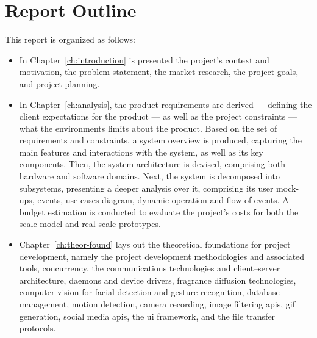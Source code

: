 \section{Report Outline}%
\label{sec:report-outline}
This report is organized as follows:
\begin{itemize}
\item In Chapter~\ref{ch:introduction} is presented the project's context and
  motivation, the problem statement, the market research, the project goals, and
  project planning.
\item In Chapter~\ref{ch:analysis}, the product requirements are derived --- defining the client expectations
for the product --- as well as the project constraints --- what the environments
limits about the product. Based on the set of requirements and constraints, a
system overview is produced, capturing the main features and interactions with
the system, as well as its key components.
Then, the system architecture is
devised, comprising both hardware and software domains. Next, the system is
decomposed into subsystems, presenting a deeper analysis over it, comprising its
user mock-ups, events, use cases diagram, dynamic operation and flow of
events. A budget estimation is conducted to evaluate the project's costs for
both the scale-model and real-scale prototypes.
\item Chapter~\ref{ch:theor-found} lays out the theoretical foundations for
project development, namely the project development methodologies and associated
tools, concurrency, the communications technologies and client--server
architecture, daemons and device drivers, fragrance diffusion technologies,
computer vision for facial detection and gesture recognition, database
management, motion detection, camera recording, image filtering \gls{api}s,
\gls{gif} generation, social media \gls{api}s, the \gls{ui} framework, and the
file transfer protocols. 

\end{itemize}
